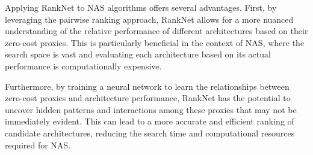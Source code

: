 Applying RankNet to \gls{NAS} algorithms offers several advantages. First, by leveraging the pairwise ranking approach, RankNet allows for a more nuanced understanding of the relative performance of different architectures based on their zero-cost proxies. This is particularly beneficial in the context of \gls{NAS}, where the search space is vast and evaluating each architecture based on its actual performance is computationally expensive.

Furthermore, by training a neural network to learn the relationships between zero-cost proxies and architecture performance, RankNet has the potential to uncover hidden patterns and interactions among these proxies that may not be immediately evident. This can lead to a more accurate and efficient ranking of candidate architectures, reducing the search time and computational resources required for \gls{NAS}.

\begin{comment}
The model consists of a neural network with one or more hidden layers, which processes the input features and outputs a single scalar score for each entity. The difference in scores between entities in a pair represents their predicted ranking. The model's parameters are learned through gradient descent by minimising the pairwise loss function, quantifying the difference between the predicted and true preferences in the training data.

Using RankNet, researchers can develop ranking-based approaches for various applications, including evaluating and selecting architectures in Neural Architecture Search (\gls{NAS}) algorithms. Adapting RankNet to use zero-cost proxies as input features enables leveraging the information provided by these proxies to guide the search process towards the most promising candidate architectures.

\end{comment}


